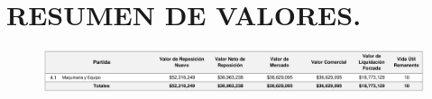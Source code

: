 \chapter{RESUMEN DE VALORES.} %

\begin{figure}[hbtp!]
	\centering
	\includegraphics[width=  \linewidth]{../0.imagenes/CAP_7/1}
\end{figure}

